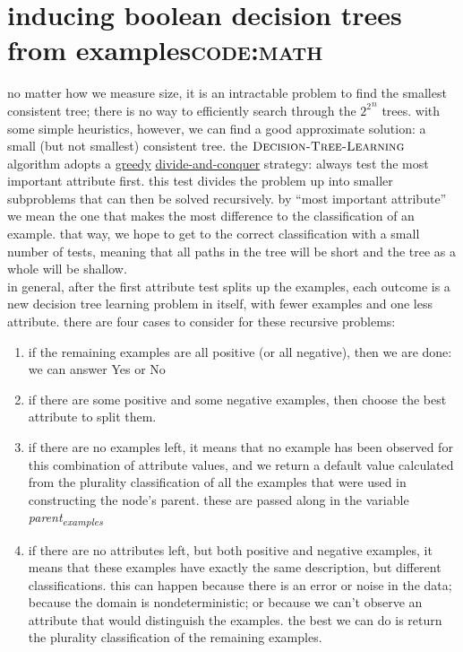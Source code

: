 \documentclass[a4paper,12pt]{article}
\begin{document}
\section{inducing boolean decision trees from examples\hfill{}\textsc{code:math}}
\label{sec:org7059b94}
no matter how we measure size, it is an intractable problem to find the smallest consistent tree; there is no way to efficiently search through the \({2^2}^n\) trees. with some simple heuristics, however, we can find a good approximate solution: a small (but not smallest) consistent tree. the \(\textsc{Decision-Tree-Learning}\) algorithm adopts a \href{20230118112408-greedy_algorithm.org}{greedy} \href{20220706211939-divide_and_conquer_algorithm.org}{divide-and-conquer} strategy: always test the most important attribute first. this test divides the problem up into smaller subproblems that can then be solved recursively. by “most important attribute” we mean the one that makes the most difference to the classification of an example. that way, we hope to get to the correct classification with a small number of tests, meaning that all paths in the tree will be short and the tree as a whole will be shallow.\\
in general, after the first attribute test splits up the examples, each outcome is a new decision tree learning problem in itself, with fewer examples and one less attribute. there are four cases to consider for these recursive problems:\\
\begin{enumerate}
\item if the remaining examples are all positive (or all negative), then we are done: we can answer Yes or No\\
\item if there are some positive and some negative examples, then choose the best attribute to split them.\\
\item if there are no examples left, it means that no example has been observed for this combination of attribute values, and we return a default value calculated from the plurality classification of all the examples that were used in constructing the node’s parent. these are passed along in the variable \emph{parent\textsubscript{examples}}\\
\item if there are no attributes left, but both positive and negative examples, it means that these examples have exactly the same description, but different classifications. this can happen because there is an error or noise in the data; because the domain is nondeterministic; or because we can’t observe an attribute that would distinguish the examples. the best we can do is return the plurality classification of the remaining examples.\\
\end{enumerate}
\end{document}
